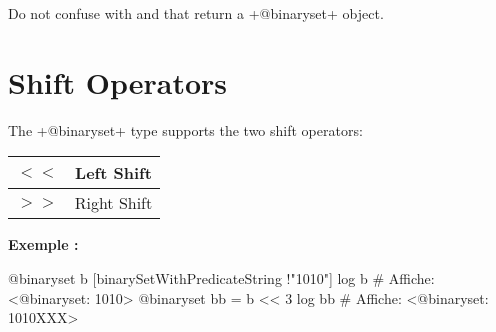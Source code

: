 Do not confuse with  and  that return a \ggs+@binaryset+ object.







\section{Shift Operators}

The \ggs+@binaryset+ type supports the two shift operators:\newline

\begin{tabular}{|c|c|}
\hline
$<<$ & Left Shift \\
\hline
$>>$ & Right Shift \\
\hline
\end{tabular}

\textbf{Exemple :}
\begin{galgas}
@binaryset b [binarySetWithPredicateString !"1010"]
log b # Affiche: <@binaryset: 1010>
@binaryset bb = b << 3
log bb # Affiche: <@binaryset: 1010XXX>
\end{galgas}

